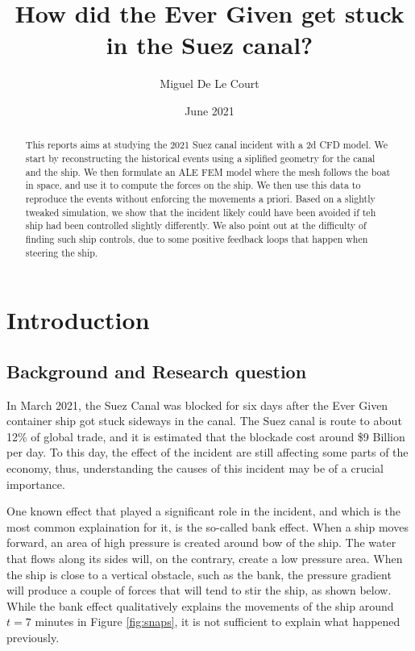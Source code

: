 \documentclass[a4paper]{article}
\title{How did the Ever Given get stuck in the Suez canal?}
\author{Miguel De Le Court}
\date{June 2021}
\begin{document}
\maketitle

\vfill

\begin{abstract}
    This reports aims at studying the 2021 Suez canal incident with a 2d CFD model. We start by reconstructing the historical events using a siplified geometry for the canal and the ship. We then formulate an ALE FEM model where the mesh follows the boat in space, and use it to compute the forces on the ship. We then use this data to reproduce the events without enforcing the movements a priori. Based on a slightly tweaked simulation, we show that the incident likely could have been avoided if teh ship had been controlled slightly differently. We also point out at the difficulty of finding such ship controls, due to some positive feedback loops that happen when steering the ship.
\end{abstract}
\vfill

\newpage
\section{Introduction}
\subsection{Background and Research question}
In March 2021, the Suez Canal was blocked for six days after the Ever Given container ship got stuck sideways in the canal. The Suez canal is route to about 12\% of global trade, and it is estimated that the blockade cost around \$9 Billion per day\cite{bbc:cost}\cite{bbc:cost2}\cite{guardian:cost}. To this day, the effect of the incident are still affecting some parts of the economy\cite{consequ1}\cite{consequ2}, thus, understanding the causes of this incident may be of a crucial importance. 

One known effect that played a significant role in the incident, and which is the most common explaination for it, is the so-called bank effect. When a ship moves forward, an area of high pressure is created around bow of the ship. The water that flows along its sides will, on the contrary, create a low pressure area. When the ship is close to a vertical obstacle, such as the bank, the pressure gradient will produce a couple of forces that will tend to stir the ship\cite{bankeffect}, as shown below. While the bank effect qualitatively explains the movements of the ship around $t=7$ minutes in Figure \ref{fig:snaps}, it is not sufficient to explain what happened previously.
\end{document}
